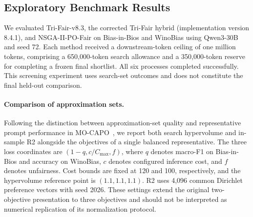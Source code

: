 \subsection{Exploratory Benchmark Results}
We evaluated Tri-Fair-v8.3, the corrected Tri-Fair hybrid (implementation
version 8.4.1), and NSGA-II-PO-Fair on Bias-in-Bios and WinoBias using
Qwen3-30B and seed 72. Each method received a downstream-token ceiling of
one million tokens, comprising a 650,000-token search allowance and a
350,000-token reserve for completing a frozen final shortlist. All six
processes completed successfully. This screening experiment uses search-set
outcomes and does not constitute the final held-out comparison.

\paragraph{Comparison of approximation sets.}
Following the distinction between approximation-set quality and representative
prompt performance in MO-CAPO~\cite{bussing2026mocapo}, we report both search
hypervolume and in-sample R2 alongside the objectives of a single balanced
representative. The three loss coordinates are $(1-q,c/C_{\max},f)$, where
$q$ denotes macro-F1 on Bias-in-Bios and accuracy on WinoBias, $c$ denotes
configured inference cost, and $f$ denotes unfairness. Cost bounds are fixed
at 120 and 100, respectively, and the hypervolume reference point is
$(1.1,1.1,1.1)$. R2 uses 4,096 common Dirichlet preference vectors with seed
2026. These settings extend the original two-objective presentation to three
objectives and should not be interpreted as numerical replication of its
normalization protocol.

